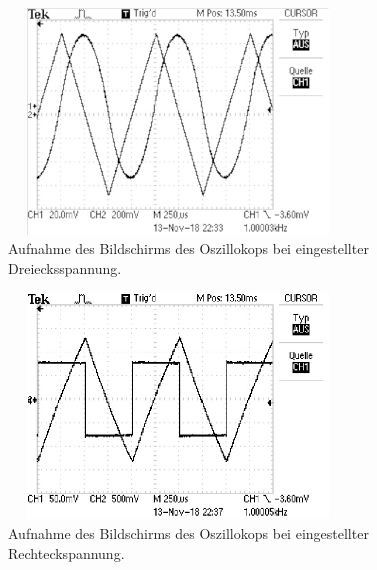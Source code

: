 \begin{figure}
  \centering
  \includegraphics[width=9cm, height=6cm]{build/integrator2.pdf}
  \caption{Aufnahme des Bildschirms des Oszillokops bei eingestellter Dreiecksspannung.}
  \label{fig: dreieck}
\end{figure}

\begin{figure}
  \centering
  \includegraphics[width=9cm, height=6cm]{build/integrator3.pdf}
  \caption{Aufnahme des Bildschirms des Oszillokops bei eingestellter Rechteckspannung.}
  \label{fig: rechteck}
\end{figure}

\newpage
\newpage
